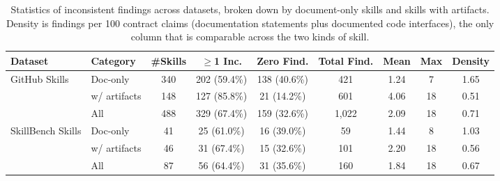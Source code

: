 \begin{table}[t]
\centering
\small
\caption{Statistics of inconsistent findings across datasets, broken down by document-only skills and skills with artifacts. Density is findings per 100 contract claims (documentation statements plus documented code interfaces), the only column that is comparable across the two kinds of skill.}
\label{tab:finding_stats}
\setlength{\tabcolsep}{3.2pt}
\begin{tabular}{llccccccc}
\toprule
Dataset & Category & \#Skills & $\ge$1 Inc. & Zero Find. & Total Find. & Mean & Max & Density \\
\midrule
GitHub Skills
& Doc-only & 340 & 202 (59.4\%) & 138 (40.6\%) & 421 & 1.24 & 7 & 1.65 \\
& w/ artifacts & 148 & 127 (85.8\%) & 21 (14.2\%) & 601 & 4.06 & 18 & 0.51 \\
& All & 488 & 329 (67.4\%) & 159 (32.6\%) & 1,022 & 2.09 & 18 & 0.71 \\
\midrule
SkillBench Skills
& Doc-only & 41 & 25 (61.0\%) & 16 (39.0\%) & 59 & 1.44 & 8 & 1.03 \\
& w/ artifacts & 46 & 31 (67.4\%) & 15 (32.6\%) & 101 & 2.20 & 18 & 0.56 \\
& All & 87 & 56 (64.4\%) & 31 (35.6\%) & 160 & 1.84 & 18 & 0.67 \\
\bottomrule
\end{tabular}
\end{table}
